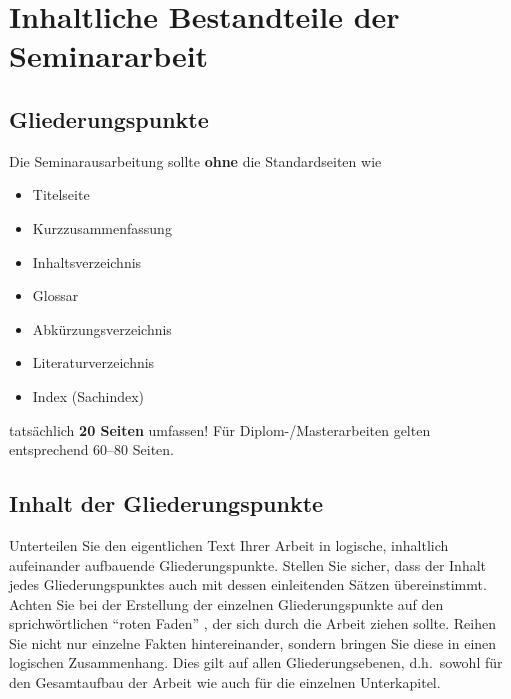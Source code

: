 %
\section{Inhaltliche Bestandteile der Seminararbeit}
\label{sec_inhalt}

\subsection{Gliederungspunkte}

Die Seminarausarbeitung sollte {\bf ohne} die Standardseiten wie
\begin{itemize}
\item Titelseite
\item Kurzzusammenfassung
\item Inhaltsverzeichnis
\item Glossar
\item Abkürzungsverzeichnis
\item Literaturverzeichnis
\item Index (Sachindex)
\end{itemize}
tatsächlich {\bf 20 Seiten} umfassen!
Für Diplom-/Masterarbeiten gelten entsprechend 60--80 Seiten.

\subsection{Inhalt der Gliederungspunkte}
Unterteilen Sie den eigentlichen Text Ihrer Arbeit in logische, inhaltlich aufeinander aufbauende Gliederungspunkte.
Stellen Sie sicher, dass der Inhalt jedes Gliederungspunktes auch mit dessen einleitenden Sätzen übereinstimmt.
Achten Sie bei der Erstellung der einzelnen Gliederungspunkte auf den sprichwörtlichen "`roten Faden"' , der sich durch die Arbeit ziehen sollte.
Reihen Sie nicht nur einzelne Fakten hintereinander, sondern bringen Sie diese in einen logischen Zusammenhang.
Dies gilt auf allen Gliederungsebenen, d.h.~sowohl für den Gesamtaufbau der Arbeit wie auch für die einzelnen Unterkapitel.

